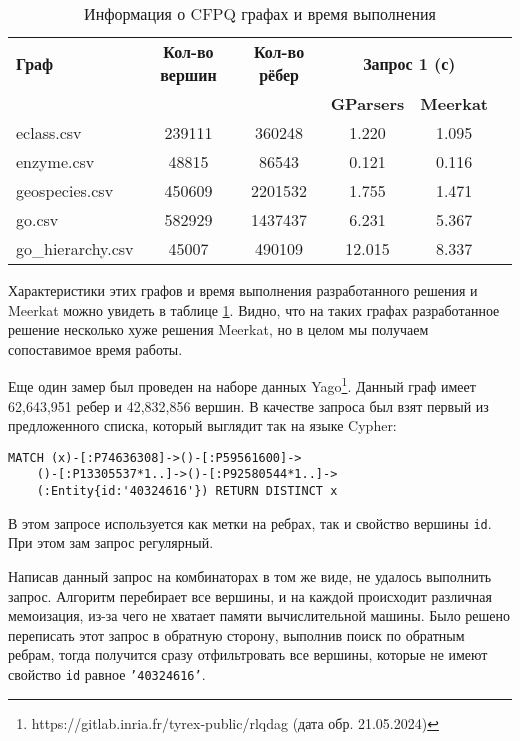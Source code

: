 \begin{table}[h]
    \caption{Информация о CFPQ графах и время выполнения}
    \begin{tabular}{|l|c|c|c|c|c|}
        
    \hline
    \textbf{Граф} & \textbf{Кол-во вершин} & \textbf{Кол-во рёбер} & \multicolumn{2}{|c|}{\textbf{Запрос 1 (с)}} \\
    \cline{4-5}
    & & & \textbf{GParsers} & \textbf{Meerkat} \\
    \hline
    eclass.csv & 239111 & 360248 & 1.220 & 1.095 \\
    enzyme.csv & 48815 & 86543 & 0.121 & 0.116 \\
    geospecies.csv & 450609 & 2201532 & 1.755 & 1.471 \\
    go.csv & 582929 & 1437437 & 6.231 & 5.367 \\
    go\_hierarchy.csv & 45007 & 490109 & 12.015 & 8.337 \\
    \hline
    \end{tabular}
    \label{tab:CFPQTimes}
\end{table}

Характеристики этих графов и время выполнения разработанного решения и Meerkat можно увидеть в таблице \ref{tab:CFPQTimes}. Видно, что на таких графах разработанное решение несколько хуже решения Meerkat, но в целом мы получаем сопоставимое время работы.

Еще один замер был проведен на наборе данных Yago\footnote{https://gitlab.inria.fr/tyrex-public/rlqdag (дата обр. 21.05.2024)}. Данный граф имеет 62,643,951 ребер и 42,832,856 вершин. В качестве запроса был взят первый из предложенного списка, который выглядит так на языке Cypher:
\begin{Verbatim}
MATCH (x)-[:P74636308]->()-[:P59561600]->
    ()-[:P13305537*1..]->()-[:P92580544*1..]->
    (:Entity{id:'40324616'}) RETURN DISTINCT x
\end{Verbatim}

В этом запросе используется как метки на ребрах, так и свойство вершины \texttt{id}. При этом зам запрос регулярный.

Написав данный запрос на комбинаторах в том же виде, не удалось выполнить запрос. Алгоритм перебирает все вершины, и на каждой происходит различная мемоизация, из-за чего не хватает памяти вычислительной машины. Было решено переписать этот запрос в обратную сторону, выполнив поиск по обратным ребрам, тогда получится сразу отфильтровать все вершины, которые не имеют свойство \texttt{id} равное \texttt{'40324616'}. 


